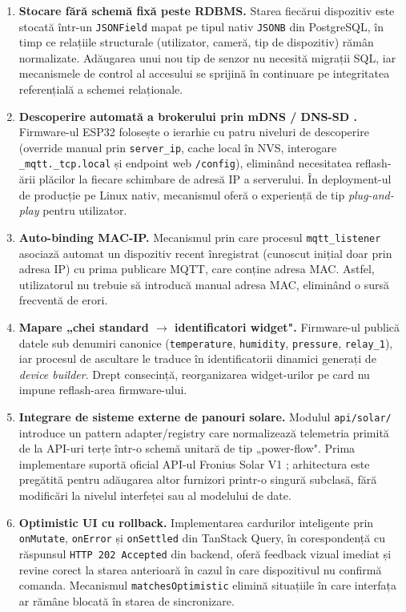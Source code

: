 \begin{enumerate}
    \item \textbf{Stocare fără schemă fixă peste RDBMS.} Starea fiecărui dispozitiv este stocată într-un \texttt{JSONField} mapat pe tipul nativ \texttt{JSONB} din PostgreSQL, în timp ce relațiile structurale (utilizator, cameră, tip de dispozitiv) rămân normalizate. Adăugarea unui nou tip de senzor nu necesită migrații SQL, iar mecanismele de control al accesului se sprijină în continuare pe integritatea referențială a schemei relaționale.
    \item \textbf{Descoperire automată a brokerului prin mDNS / DNS-SD \cite{rfc_mdns, rfc_dnssd}.} Firmware-ul ESP32 folosește o ierarhie cu patru niveluri de descoperire (override manual prin \texttt{server\_ip}, cache local în NVS, interogare \texttt{\_mqtt.\_tcp.local} și endpoint web \texttt{/config}), eliminând necesitatea reflash-ării plăcilor la fiecare schimbare de adresă IP a serverului. În deployment-ul de producție pe Linux nativ, mecanismul oferă o experiență de tip \emph{plug-and-play} pentru utilizator.
    \item \textbf{Auto-binding MAC-IP.} Mecanismul prin care procesul \texttt{mqtt\_listener} asociază automat un dispozitiv recent înregistrat (cunoscut inițial doar prin adresa IP) cu prima publicare MQTT, care conține adresa MAC. Astfel, utilizatorul nu trebuie să introducă manual adresa MAC, eliminând o sursă frecventă de erori.
    \item \textbf{Mapare „chei standard $\rightarrow$ identificatori widget".} Firmware-ul publică datele sub denumiri canonice (\texttt{temperature}, \texttt{humidity}, \texttt{pressure}, \texttt{relay\_1}), iar procesul de ascultare le traduce în identificatorii dinamici generați de \emph{device builder}. Drept consecință, reorganizarea widget-urilor pe card nu impune reflash-area firmware-ului.
    \item \textbf{Integrare de sisteme externe de panouri solare.} Modulul \texttt{api/solar/} introduce un pattern adapter/registry care normalizează telemetria primită de la API-uri terțe într-o schemă unitară de tip „power-flow". Prima implementare suportă oficial API-ul Fronius Solar V1 \cite{fronius_solar_api}; arhitectura este pregătită pentru adăugarea altor furnizori printr-o singură subclasă, fără modificări la nivelul interfeței sau al modelului de date.
    \item \textbf{Optimistic UI cu rollback.} Implementarea cardurilor inteligente prin \texttt{onMutate}, \texttt{onError} și \texttt{onSettled} din TanStack Query, în corespondență cu răspunsul \texttt{HTTP 202 Accepted} din backend, oferă feedback vizual imediat și revine corect la starea anterioară în cazul în care dispozitivul nu confirmă comanda. Mecanismul \texttt{matchesOptimistic} elimină situațiile în care interfața ar rămâne blocată în starea de sincronizare.

\end{enumerate}
